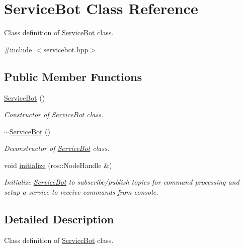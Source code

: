 \hypertarget{classServiceBot}{\section{Service\-Bot Class Reference}
\label{classServiceBot}
}


Class definition of \hyperlink{classServiceBot}{Service\-Bot} class.  




{\ttfamily \#include $<$servicebot.\-hpp$>$}

\subsection*{Public Member Functions}
\begin{DoxyCompactItemize}
\item 
\hyperlink{classServiceBot_af3b733091a436c737002e87d887896ad}{Service\-Bot} ()
\begin{DoxyCompactList}\small\item\em Constructor of \hyperlink{classServiceBot}{Service\-Bot} class. \end{DoxyCompactList}\item 
\hyperlink{classServiceBot_a663f7b0272b024645406b67262cc89fa}{$\sim$\-Service\-Bot} ()
\begin{DoxyCompactList}\small\item\em Deconstructor of \hyperlink{classServiceBot}{Service\-Bot} class. \end{DoxyCompactList}\item 
void \hyperlink{classServiceBot_a49c6436896b801effbc7aef4ec33a6de}{initialize} (ros\-::\-Node\-Handle \&)
\begin{DoxyCompactList}\small\item\em Initialize \hyperlink{classServiceBot}{Service\-Bot} to subscribe/publish topics for command processing and setup a service to receive commands from console. \end{DoxyCompactList}\end{DoxyCompactItemize}


\subsection{Detailed Description}
Class definition of \hyperlink{classServiceBot}{Service\-Bot} class. 

